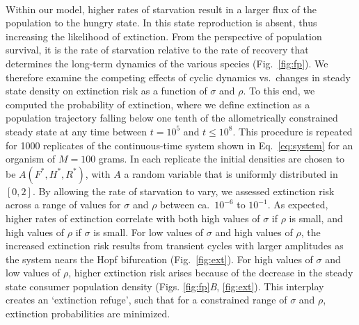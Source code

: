 \documentclass{pnastwo}
\begin{document}
\begin{article}
\\
Within our model, higher rates of starvation result in a larger flux of the population to the hungry state.  
In this state reproduction is absent, thus increasing the likelihood of extinction.  From the perspective of population survival, it is the rate of starvation relative to the rate of recovery that determines the long-term dynamics of the various species (Fig.~\ref{fig:fp}). 
We therefore examine the competing effects of cyclic dynamics vs.\ changes in steady state density on extinction risk as a function of $\sigma$ and $\rho$.  
To this end, we computed the probability of extinction, where we define extinction as a population trajectory falling below one tenth of the allometrically constrained steady state at any time between $t=10^5$ and $t \leq 10^8$.  
This procedure is repeated for 1000 replicates of the continuous-time system shown in Eq.~\ref{eq:system} for an organism of $M=100$ grams.
In each replicate the initial densities are chosen to be $A(F^*,H^*,R^*)$, with $A$ a random variable that is uniformly distributed in $[0,2]$.  
By allowing the rate of starvation to vary, we assessed extinction risk across a range of values for $\sigma$ and $\rho$ between ca.\ $10^{-6}$ to $10^{-1}$. %
As expected, higher rates of extinction correlate with both high values of $\sigma$ if $\rho$ is small, and high values of $\rho$ if $\sigma$ is small.  
For low values of $\sigma$ and high values of $\rho$, the increased extinction risk results from transient cycles with larger amplitudes as the system nears the Hopf bifurcation (Fig.~\ref{fig:ext}).  
For high values of $\sigma$ and low values of $\rho$, higher extinction risk arises because of the decrease in the steady state consumer population density (Figs. \ref{fig:fp}\emph{B}, \ref{fig:ext}).  
This interplay creates an `extinction refuge', such that for a constrained range of $\sigma$ and $\rho$, extinction probabilities are minimized.


\end{article}
\end{document}
